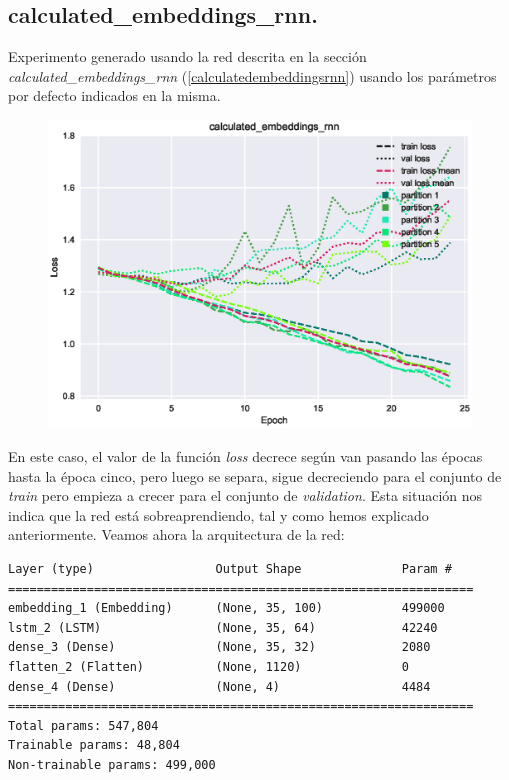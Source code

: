 \documentclass[11pt]{article}
\begin{document}
\subsection{calculated\_embeddings\_rnn.} \label{exp_calculatedembeddingsrnn}

Experimento generado usando la red descrita en la sección \textit{calculated\_embeddings\_rnn} (\ref{calculatedembeddingsrnn}) usando los parámetros por defecto indicados en la misma.

\begin{figure}[H]
\includegraphics[width=\linewidth]{images/loss/calculated_embeddings_rnn-1554203049.eps}
\end{figure}

En este caso, el valor de la función \textit{loss} decrece según van pasando las épocas hasta la época cinco, pero luego se separa, sigue decreciendo para el conjunto de \textit{train} pero empieza a crecer para el conjunto de \textit{validation}. Esta situación nos indica que la red está sobreaprendiendo, tal y como hemos explicado anteriormente. Veamos ahora la arquitectura de la red:

\begin{verbatim}
Layer (type)                 Output Shape              Param #   
=================================================================
embedding_1 (Embedding)      (None, 35, 100)           499000    
lstm_2 (LSTM)                (None, 35, 64)            42240     
dense_3 (Dense)              (None, 35, 32)            2080      
flatten_2 (Flatten)          (None, 1120)              0         
dense_4 (Dense)              (None, 4)                 4484      
=================================================================
Total params: 547,804
Trainable params: 48,804
Non-trainable params: 499,000
\end{verbatim}
\end{document}
